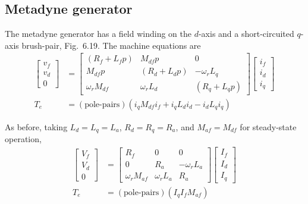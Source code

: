 \documentclass[a4paper,numbers=noenddot,12pt]{scrbook}
\begin{document}
    \subsection{Metadyne generator}
    The metadyne generator has a field winding on the $d$-axis and a short-circuited $q$-axis brush-pair, Fig.\ 6.19. The machine equations are
    \begin{align}
        \begin{bmatrix}
            v_f \\ v_d \\ 0
        \end{bmatrix}
        & =
        \begin{bmatrix}
            (R_f + L_f p) & M_{df} p & 0 \\
            M_{df} p & (R_d + L_d p) & -\omega_r L_q \\
            \omega_r M_{df} & \omega_r L_d & (R_q + L_q p) 
        \end{bmatrix}
        \begin{bmatrix}
            i_f \\ i_d \\ i_q
        \end{bmatrix} \\
        T_e & = (\text{pole-pairs})(i_q M_{df} i_f + i_q L_d i_d - i_d L_q i_q)
        \label{eq:Eq6.84}
    \end{align}

    As before, taking $L_d = L_q = L_a$, $R_d = R_q = R_a$, and $M_{af} = M_{df}$ for steady-state operation,
    \begin{align}
        \begin{bmatrix}
            V_f \\ V_d \\ 0
        \end{bmatrix}
        & =
        \begin{bmatrix}
            R_f & 0 & 0 \\
            0 & R_a & -\omega_r L_a \\
            \omega_r M_{af} & \omega_r L_a & R_a 
        \end{bmatrix}
        \begin{bmatrix}
            I_f \\ I_d \\ I_q
        \end{bmatrix} \\
        T_e & = (\text{pole-pairs})(I_q I_f M_{af})
        \label{eq:Eq6.86}
    \end{align}
\end{document}
